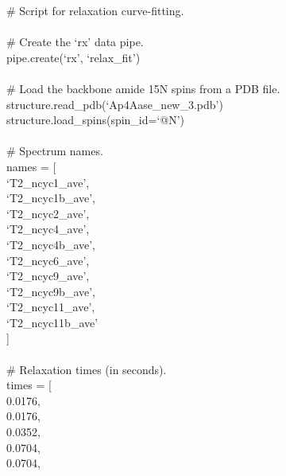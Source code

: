 \begin{exampleenv}
\# Script for relaxation curve-fitting. \\
 \\
\# Create the `rx' data pipe. \\
pipe.create(`rx', `relax\_fit') \\
 \\
\# Load the backbone amide 15N spins from a PDB file. \\
structure.read\_pdb(`Ap4Aase\_new\_3.pdb') \\
structure.load\_spins(spin\_id=`@N') \\
 \\
\# Spectrum names. \\
names = [ \\
\hspace*{4ex} `T2\_ncyc1\_ave', \\
\hspace*{4ex} `T2\_ncyc1b\_ave', \\
\hspace*{4ex} `T2\_ncyc2\_ave', \\
\hspace*{4ex} `T2\_ncyc4\_ave', \\
\hspace*{4ex} `T2\_ncyc4b\_ave', \\
\hspace*{4ex} `T2\_ncyc6\_ave', \\
\hspace*{4ex} `T2\_ncyc9\_ave', \\
\hspace*{4ex} `T2\_ncyc9b\_ave', \\
\hspace*{4ex} `T2\_ncyc11\_ave', \\
\hspace*{4ex} `T2\_ncyc11b\_ave' \\
] \\
 \\
\# Relaxation times (in seconds). \\
times = [ \\
\hspace*{4ex} 0.0176, \\
\hspace*{4ex} 0.0176, \\
\hspace*{4ex} 0.0352, \\
\hspace*{4ex} 0.0704, \\
\hspace*{4ex} 0.0704, \\

\end{exampleenv}
